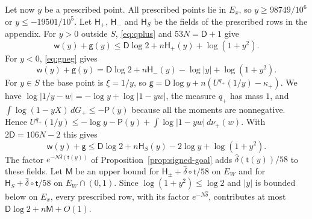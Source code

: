 Let now $y$ be a prescribed point. All prescribed points lie in $E_x$, so $y\ge98749/10^6$ or $y\le-19501/10^5$. Let $\mathsf H_+$, $\mathsf H_-$ and $\mathsf H_S$ be the fields of the prescribed rows in
the appendix. For $y>0$ outside $S$, \eqref{eq:qplus} and $53N=\mathsf D+1$ give
\[
 \mathsf w(y)+\mathsf g(y)\le \mathsf D\log2+n\mathsf H_+(y)+\log(1+y^2).
\]
For $y<0$, \eqref{eq:gneg} gives
\[
 \mathsf w(y)+\mathsf g(y)=\mathsf D\log2+n\mathsf H_-(y)-\log|y|+\log(1+y^2).
\]
For $y\in S$ the base point is $\xi=1/y$, so $\mathsf g=\mathsf D\log y+n(U^{q_+}(1/y)-\kappa_+)$. We have $\log|1/y-w|=-\log y+\log|1-yw|$, the measure $q_+$ has mass $1$, and $\int\log(1-yX)\,dG_+\le-\mathsf P(y)$
because all the moments are nonnegative. Hence $U^{q_+}(1/y)\le-\log y-\mathsf P(y)+\int\log|1-yw|\,d\nu_+(w)$. With $2\mathsf D=106N-2$ this gives
\[
 \mathsf w(y)+\mathsf g\le \mathsf D\log2+n\mathsf H_S(y)-2\log y+\log(1+y^2).
\]
The factor $e^{-N\hat\delta(\mathsf t(y))}$ of Proposition~\ref{prop:signed-goal} adds $\hat\delta(\mathsf t(y))/58$ to these fields. Let $\mathsf M$ be an upper bound for $\mathsf H_\pm+\hat\delta\circ\mathsf t/58$ on $E_W$ and for $\mathsf H_S+\hat\delta\circ\mathsf t/58$ on $E_W\cap(0,1)$. Since $\log(1+y^2)\le\log2$ and $|y|$ is bounded below on $E_x$, every prescribed row, with its factor $e^{-N\hat\delta}$, contributes at most
$\mathsf D\log2+n\mathsf M+O(1)$.

